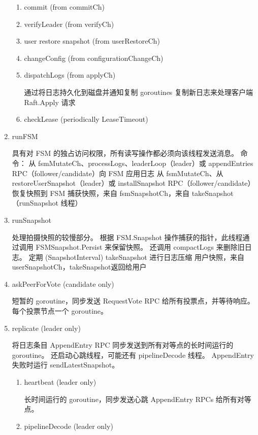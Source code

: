 \begin{enumerate}
\begin{enumerate}
						\item commit (from commitCh) 
						
						\item verifyLeader (from verifyCh) 
						
						\item user restore snapshot (from userRestoreCh) 
						
						\item changeConfig (from configurationChangeCh) 
						
						\item dispatchLogs (from applyCh) 
						
						通过将日志持久化到磁盘并通知复制 goroutines 复制新日志来处理客户端 Raft.Apply 请求
						
						\item checkLease (periodically LeaseTimeout) 
						
					\end{enumerate}

				
				
				\item runFSM 
				
				具有对 FSM 的独占访问权限，所有读写操作都必须向该线程发送消息。 命令：
从 fsmMutateCh、processLogs、leaderLoop（leader）或 appendEntries RPC（follower/candidate）向 FSM 应用日志
从 fsmMutateCh、从 restoreUserSnapshot（leader）或 installSnapshot RPC（follower/candidate）恢复快照到 FSM
捕获快照，来自 fsmSnapshotCh，来自 takeSnapshot（runSnapshot 线程）

				\item runSnapshot
				
				处理拍摄快照的较慢部分。 根据 FSM.Snapshot 操作捕获的指针，此线程通过调用 FSMSnapshot.Persist 来保留快照。 还调用 compactLogs 来删除旧日志。
定期 (SnapshotInterval) takeSnapshot 进行日志压缩
用户快照，来自userSnapshotCh，takeSnapshot返回给用户
				
				\item askPeerForVote (candidate only)
				
				短暂的 goroutine，同步发送 RequestVote RPC 给所有投票点，并等待响应。 每个投票节点一个 goroutine。
				
				\item replicate (leader only)
				
				将日志条目 AppendEntry RPC 同步发送到所有对等点的长时间运行的 goroutine。 还启动心跳线程，可能还有 pipelineDecode 线程。 AppendEntry 失败时运行 sendLatestSnapshot。
				
				\begin{enumerate}
				
					\item heartbeat (leader only) 
					
					长时间运行的 goroutine，同步发送心跳 AppendEntry RPCs 给所有对等点。

					\item pipelineDecode (leader only)
										
				\end{enumerate}

			\end{enumerate}

